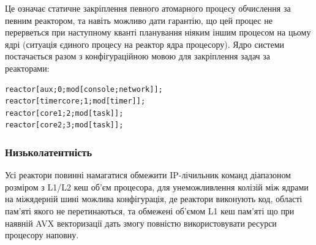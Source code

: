 Це означає статичне закріплення певного атомарного процесу
обчислення за певним реактором, та навіть можливо дати гарантію, що
цей процес не перерветься при наступному кванті планування
ніяким іншим процесом на цьому ядрі (ситуація єдиного процесу
на реактор ядра процесору). Ядро системи постачається разом з конфігураційною
мовою для закріплення задач за реакторами:
\begin{lstlisting}
reactor[aux;0;mod[console;network]];
reactor[timercore;1;mod[timer]];
reactor[core1;2;mod[task]];
reactor[core2;3;mod[task]];
\end{lstlisting}

\subsubsection{Низьколатентність}
Усі реактори повинні намагатися обмежити IP-лічильник команд
діапазоном розміром з L1/L2 кеш об'єм процесора, для унеможливлення
колізій між ядрами на міжядерній шині можлива конфігурація, де
реактори виконують код, області пам'яті якого не перетинаються,
та обмежені об'ємом L1 кеш пам'яті що при наявній AVX векторизації
дать змогу повністю використовувати ресурси процесору наповну.

\newpage
